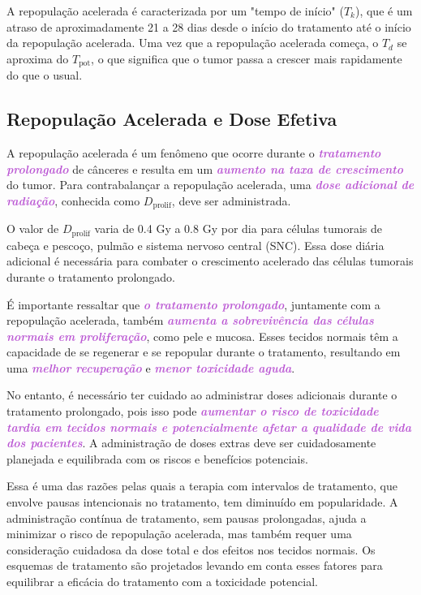 \documentclass[11pt,a4paper]{article}
\begin{document}
	A repopulação acelerada é caracterizada por um "tempo de início" ($T_k$), que é um atraso de aproximadamente 21 a 28 dias desde o início do tratamento até o início da repopulação acelerada. Uma vez que a repopulação acelerada começa, o $T_d$ se aproxima do $T_{\text{pot}}$, o que significa que o tumor passa a crescer mais rapidamente do que o usual.

\subsection*{Repopulação Acelerada e Dose Efetiva}

	A repopulação acelerada é um fenômeno que ocorre durante o \textcolor{MediumOrchid}{\textbf{\textit{tratamento prolongado}}} de cânceres e resulta em um \textcolor{MediumOrchid}{\textbf{\textit{aumento na taxa de crescimento}}} do tumor. Para contrabalançar a repopulação acelerada, uma \textcolor{MediumOrchid}{\textbf{\textit{dose adicional de radiação}}}, conhecida como $D_{\text{prolif}}$, deve ser administrada.

	O valor de $D_{\text{prolif}}$ varia de 0.4 Gy a 0.8 Gy por dia para células tumorais de cabeça e pescoço, pulmão e sistema nervoso central (SNC). Essa dose diária adicional é necessária para combater o crescimento acelerado das células tumorais durante o tratamento prolongado.

	É importante ressaltar que \textcolor{MediumOrchid}{\textbf{\textit{o tratamento prolongado}}}, juntamente com a repopulação acelerada, também \textcolor{MediumOrchid}{\textbf{\textit{aumenta a sobrevivência das células normais em proliferação}}}, como pele e mucosa. Esses tecidos normais têm a capacidade de se regenerar e se repopular durante o tratamento, resultando em uma \textcolor{MediumOrchid}{\textbf{\textit{melhor recuperação}}} e \textcolor{MediumOrchid}{\textbf{\textit{menor toxicidade aguda}}}.

	No entanto, é necessário ter cuidado ao administrar doses adicionais durante o tratamento prolongado, pois isso pode \textcolor{MediumOrchid}{\textbf{\textit{aumentar o risco de toxicidade tardia em tecidos normais e potencialmente afetar a qualidade de vida dos pacientes}}}. A administração de doses extras deve ser cuidadosamente planejada e equilibrada com os riscos e benefícios potenciais.

	Essa é uma das razões pelas quais a terapia com intervalos de tratamento, que envolve pausas intencionais no tratamento, tem diminuído em popularidade. A administração contínua de tratamento, sem pausas prolongadas, ajuda a minimizar o risco de repopulação acelerada, mas também requer uma consideração cuidadosa da dose total e dos efeitos nos tecidos normais. Os esquemas de tratamento são projetados levando em conta esses fatores para equilibrar a eficácia do tratamento com a toxicidade potencial.
\end{document}
